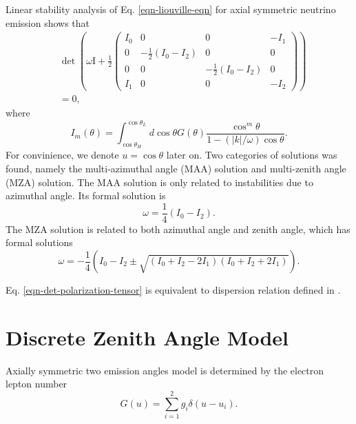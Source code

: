 \documentclass[%
 reprint,
 amsmath,amssymb,
 aps,
 prd
]{revtex4-1}
\begin{document}
Linear stability analysis of Eq. \eqref{eqn-liouville-eqn} for axial symmetric neutrino emission shows that
\begin{align}
&\det \left( \omega \mathrm{I} + \frac{1}{2}
\begin{pmatrix}
   I_0 & 0 & 0 & -I_1 \\
   0 & -\frac{1}{2} (I_0 - I_2) & 0 & 0 \\
   0 & 0 & -\frac{1}{2} (I_0 - I_2) & 0 \\
   I_1 & 0 & 0 & -I_2
\end{pmatrix}\right) \nonumber\\
&=0,
\label{eqn-det-polarization-tensor}
\end{align}
where
\begin{equation}
   I_m(\theta)=\int_{\cos\theta_H}^{\cos\theta_L} d\cos\theta G(\theta) \frac{\cos^m\theta}{1 -  \left(\lvert k\rvert /\omega\right) \cos\theta }.
\end{equation}
For convinience, we denote $u=\cos\theta$ later on. Two categories of solutions was found, namely the multi-azimuthal angle (MAA) solution and multi-zenith angle (MZA) solution. The MAA solution is only related to instabilities due to azimuthal angle. Its formal solution is
\begin{equation}
   \omega = \frac{1}{4}(I_0 - I_2).
\end{equation}
The MZA solution is related to both azimuthal angle and zenith angle, which has formal solutions
\begin{equation}
\omega = - \frac{1}{4} \left( I_0 - I_2 \pm \sqrt{ (I_0 + I_2 - 2 I_1) (I_0 + I_2 + 2 I_1) } \right).
\end{equation}


Eq. \eqref{eqn-det-polarization-tensor} is equivalent to dispersion relation defined in .

{\color{red}{\bf HAVE TO EXPLAIN THE IDEA OF GAP AND INSTABILITY HERE.}}






\section{\label{sec-twobeams}Discrete Zenith Angle Model}

Axially symmetric two emission angles model is determined by the electron lepton number
\begin{equation}
G(u)= \sum_{i=1}^2 g_i \delta(u - u_i).
\end{equation}
\end{document}
